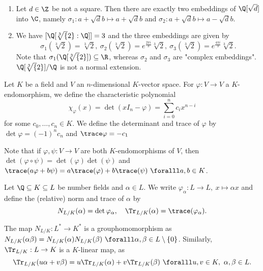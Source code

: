 \begin{exmp*}
	\begin{enumerate}
		\item Let \( d \in \Z \) be not a square.
			Then there are exactly two embeddings of \( \Q[\sqrt{d}] \) into \( \C \), namely \( \sigma_1: a+\sqrt{d}b \mapsto a + \sqrt{d}b \) and \( \sigma_2: a+\sqrt{d}b \mapsto a - \sqrt{d}b \).
		\item We have \( [\Q[\sqrt[3]{2}:\Q]] = 3 \) and the three embeddings are given by 
			\[ \sigma_1(\sqrt[3]{2}) = \sqrt[3]{2},\ \sigma_2(\sqrt[3]{2}) = e^\frac{2\pi i}{3}\sqrt[3]{2},\ \sigma_3(\sqrt[3]{2}) = e^\frac{4\pi i}{3}\sqrt[3]{2}. \]
			Note that \( \sigma_1(\Q[\sqrt[3]{2}]) \subseteq \R \), whereas \( \sigma_2 \) and \( \sigma_3 \) are "complex embeddings".
			\( \Q[\sqrt[3]{2}] / \Q \) is not a normal extension.
	\end{enumerate}
\end{exmp*}

\begin{defn*}
	Let \( K \) be a field and \( V \) an \( n \)-dimensional \( K \)-vector space.
	For \( \varphi: V \to V \) a \( K \)-endomorphism, we define the characteristic polynomial \[ \chi_\varphi(x) = \det(xI_n - \varphi) = \sum_{i=0}^{n} c_i x^{n-i} \]
	for some \( c_0, \dotsc, c_n \in K \).
	We define the determinant and trace of \( \varphi \) by \( \det \varphi = (-1)^n c_n \) and \( \trace\varphi = -c_1 \)
\end{defn*}

Note that if \( \varphi,\psi: V \to V \) are both \( K \)-endomorphisms of \( V \), then \( \det(\varphi \circ \psi) = \det(\varphi)\det(\psi) \) and \( \trace(a\varphi + b\psi) = a \trace(\varphi) + b \trace(\psi)\ \foralll a,b \in K \).

\begin{defn*}
	Let \( \Q \subseteq K \subseteq L \) be number fields and \( \alpha \in L \).
	We write \( \varphi_\alpha: L \to L,\ x \mapsto \alpha x \) and define the (relative) norm and trace of \( \alpha \) by
	\[ N_{L/K}(\alpha) = \det \varphi_\alpha,\quad \Tr_{L/K}(\alpha) = \trace(\varphi_\alpha). \]
\end{defn*}

\begin{rem*}
	The map \( N_{L/K}: L^* \to K^* \) is a grouphomomorphism as \( N_{L/K}(\alpha\beta) = N_{L/K}(\alpha) N_{L/K}(\beta)\ \foralll \alpha,\beta \in L\setminus \{0\} \).
	Similarly, \( \Tr_{L/K}: L \to K \) is a \( K \)-linear map, as
	\[ \Tr_{L/K}(u\alpha + v\beta) = u\Tr_{L/K}(\alpha) + v\Tr_{L/K}(\beta)\ \foralll u,v \in K,\ \alpha,\beta \in L. \]
\end{rem*}

